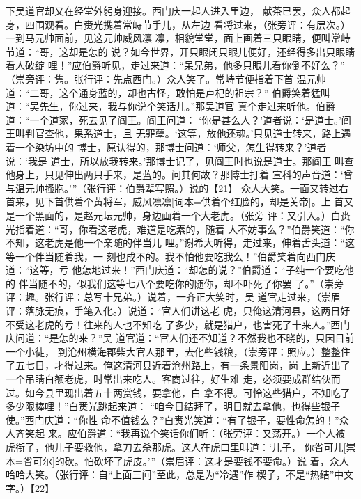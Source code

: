 \documentclass[UTF8,scheme=chinese,11pt,linespread=1.4]{ctexbook}
\makeatletter
\newcommand{\banben}[2][]{#2}
\newenvironment{diben}[1]
  {\list{}{\listparindent 2em
    \itemindent\listparindent
    \rightmargin 0em  %
    \leftmargin 0em  %
    \parsep \z@ \@plus\p@}%
   \item\relax}
  {\endlist}
\makeatother
\begin{document}
\begin{diben}
当下吴道官却又在经堂外躬身迎接。西门庆一起人进入里边，
献茶已罢，众人都起身，四围观看。白赉光携着常峙节手儿，从左边
看将过来，（张旁评：有层次。）一到马元帅面前，见这元帅威风凛
凛，相貌堂堂，面上画着三只眼睛，便叫常峙节道：“哥，这却是怎的
说？如今世界，开只眼闭只眼儿便好，还经得多出只眼睛看人破绽
哩！”应伯爵听见，走过来道：“呆兄弟，他多只眼儿看你倒不好么？”
（崇旁评：隽。张行评：先点西门。）众人笑了。常峙节便指着下首
温元帅道：“二哥，这个通身蓝的，却也古怪，敢怕是卢杞的祖宗？”
伯爵笑着猛叫道：“吴先生，你过来，我与你说个笑话儿。”那吴道官
真个走过来听他。伯爵道：“一个道家，死去见了阎王。阎王问道：
‘你是甚么人？’道者说：‘是道士。’阎王叫判官查他，果系道士，且
无罪孽。‘这等，放他还魂。’只见道士转来，路上遇着一个染坊中的
博士，原认得的，那博士问道：‘师父，怎生得转来？’道者说：‘我是
道士，所以放我转来。’那博士记了，见阎王时也说是道士。那阎王
叫查他身上，只见伸出两只手来，是蓝的。问其何故？那博士打着
宣科的声音道：‘曾与温元帅搔胞。’”（张行评：伯爵辈写照。）说的【21】
众人大笑。一面又转过右首来，见下首\banben{供着个黄将军，威风凛凛}[词本={供着个红脸的，却是关帝}]。上
首又是一个黑面的，是赵元坛元帅，身边画着一个大老虎。（张旁
评：又引入。）白赉光指着道：“哥，你看这老虎，难道是吃素的，随着
人不妨事么？”伯爵笑道：“你不知，这老虎是他一个亲随的伴当儿
哩。”谢希大听得，走过来，伸着舌头道：“这等一个伴当随着我，一
刻也成不的。我不怕他要吃我么！”伯爵笑着向西门庆道：“这等，亏
他怎地过来！”西门庆道：“却怎的说？”伯爵道：“子纯一个要吃他的
伴当随不的，似我们这等七八个要吃你的随你，却不吓死了你罢
了。”（崇旁评：趣。张行评：总写十兄弟。）说着，一齐正大笑时，吴
道官走过来，（崇眉评：落脉无痕，手笔入化。）说道：“官人们讲这老
虎，只俺这清河县，这两日好不受这老虎的亏！往来的人也不知吃
了多少，就是猎户，也害死了十来人。”西门庆问道：“是怎的来？”吴
道官道：“官人们还不知道？不然我也不晓的，只因日前一个小徒，
到沧州横海郡柴大官人那里，去化些钱粮，（崇旁评：照应。）整整住
了五七日，才得过来。俺这清河县近着沧州路上，有一条景阳岗，岗
上新近出了一个吊睛白额老虎，时常出来吃人。客商过往，好生难
走，必须要成群结伙而过。如今县里现出着五十两赏钱，要拿他，白
拿不得。可怜这些猎户，不知吃了多少限棒哩！”白赉光跳起来道：
“咱今日结拜了，明日就去拿他，也得些银子使。”西门庆道：“你性
命不值钱么？”白赉光笑道：“有了银子，要性命怎的！”众人齐笑起
来。应伯爵道：“我再说个笑话你们听：（张旁评：又荡开。）一个人被
虎衔了，他儿子要救他，拿刀去杀那虎。这人在虎口里叫道：‘儿子，
你\banben{省可儿}[崇本={省可尔}]的砍。怕砍坏了虎皮。’”（崇眉评：这才是要钱不要命。）说
着，众人哈哈大笑。（张行评：自“上面三间”至此，总是为“冷遇”作
楔子，不是“热结”中文字。）【22】


\end{diben}
\end{document}
